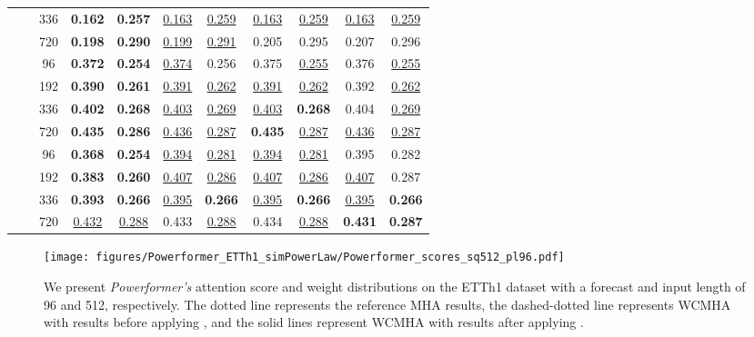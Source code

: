 \begin{table*}[!ht]
{\begin{tabular}{c|c|c|cc|cc|cc|cc}
		 & & 336 &  \textbf{0.162} & \textbf{0.257} &  \underline{0.163} & \underline{0.259} &  \underline{0.163} & \underline{0.259} &  \underline{0.163} & \underline{0.259} \\
		 & & 720 &  \textbf{0.198} & \textbf{0.290} &  \underline{0.199} & \underline{0.291} &  0.205 & 0.295 &  0.207 & 0.296 \\
	\midrule
	\multirow{8}{*}{\rotatebox[origin=c]{90}{\text{Traffic}}}
	& \multirow{4}{*}{\rotatebox[origin=c]{90}{\text{336}}}
		 & 96 &  \textbf{0.372} & \textbf{0.254} &  \underline{0.374} & 0.256 &  0.375 & \underline{0.255} &  0.376 & \underline{0.255} \\
		 & & 192 &  \textbf{0.390} & \textbf{0.261} &  \underline{0.391} & \underline{0.262} &  \underline{0.391} & \underline{0.262} &  0.392 & \underline{0.262} \\
		 & & 336 &  \textbf{0.402} & \textbf{0.268} &  \underline{0.403} & \underline{0.269} &  \underline{0.403} & \textbf{0.268} &  0.404 & \underline{0.269} \\
		 & & 720 &  \textbf{0.435} & \textbf{0.286} &  \underline{0.436} & \underline{0.287} &  \textbf{0.435} & \underline{0.287} &  \underline{0.436} & \underline{0.287} \\ \cmidrule{2-11}
	& \multirow{4}{*}{\rotatebox[origin=c]{90}{\text{512}}}
		 & 96 &  \textbf{0.368} & \textbf{0.254} &  \underline{0.394} & \underline{0.281} &  \underline{0.394} & \underline{0.281} &  0.395 & 0.282 \\
		 & & 192 &  \textbf{0.383} & \textbf{0.260} &  \underline{0.407} & \underline{0.286} &  \underline{0.407} & \underline{0.286} &  \underline{0.407} & 0.287 \\
		 & & 336 &  \textbf{0.393} & \textbf{0.266} &  \underline{0.395} & \textbf{0.266} &  \underline{0.395} & \textbf{0.266} &  \underline{0.395} & \textbf{0.266} \\
		 & & 720 &  \underline{0.432} & \underline{0.288} &  0.433 & \underline{0.288} &  0.434 & \underline{0.288} &  \textbf{0.431} & \textbf{0.287} \\
	\bottomrule
	\end{tabular}}
\end{table*}
\endgroup



\begin{figure*}[!ht]
    \centering
    \texttt{[image: figures/Powerformer\_ETTh1\_simPowerLaw/Powerformer\_scores\_sq512\_pl96.pdf]}
    \caption{We present \emph{Powerformer's} attention score and weight distributions on the ETTh1 dataset with a forecast and input length of 96 and 512, respectively. The dotted line represents the reference MHA results, the dashed-dotted line represents WCMHA with \fspl{} results before applying \maskCL, and the solid lines represent WCMHA with \fspl{} results after applying \maskCL.}
    \label{fig:powerformer_etth1_96_simPowerLaw_attn_full}
\end{figure*}

